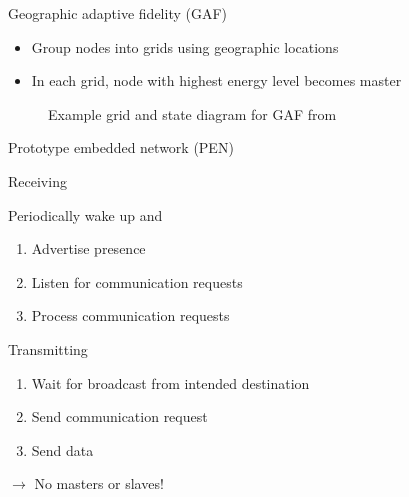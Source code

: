 \documentclass{beamer}
\begin{document}
\begin{frame}{Geographic adaptive fidelity (GAF)\cite{xu2001geography}}
    \begin{itemize}
        \item Group nodes into grids using geographic locations
        \item In each grid, node with highest energy level becomes master

    \end{itemize}
\label{gaf}
\begin{figure}[!t]
\hfill
{}
\caption{Example grid and state diagram for GAF from \cite{alotaibi2012survey}}
\end{figure}
\end{frame}

\begin{frame}{Prototype embedded network (PEN)\cite{girling2000design}}


    \begin{block}{Receiving}
        
    Periodically wake up and
    \begin{enumerate}
        \item Advertise presence
        \item Listen for communication requests
        \item Process communication requests
    \end{enumerate}
    \end{block}
    \begin{block}{Transmitting}
    \begin{enumerate}
        \item Wait for broadcast from intended destination
        \item Send communication request
        \item Send data
    \end{enumerate}
    \end{block}
$\rightarrow$ No masters or slaves!
\end{frame}
\end{document}
